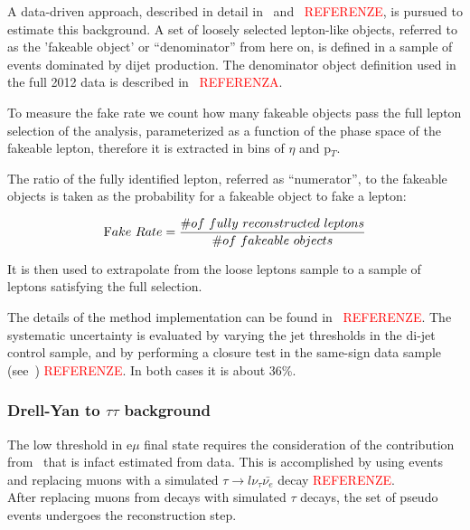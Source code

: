 A data-driven approach, described in detail in~\cite{AN-2010-261} and~\cite{AN-2010-397} \textcolor{red}{REFERENZE}, is pursued 
to estimate this background. A set of loosely selected lepton-like objects, referred to as the 
'fakeable object' or ``denominator'' from here on, is defined in a sample of events 
dominated by dijet production. The denominator object definition used in the full 2012
data is described in~\cite{AN-2012-378} \textcolor{red}{REFERENZA}.

To measure the fake rate we count how many fakeable objects pass the full lepton selection 
of the analysis, parameterized as a function of the phase space of the fakeable lepton, therefore 
it is extracted in bins of $\eta$ and p$_T$.


The ratio of the fully identified lepton, referred as ``numerator'', to the 
fakeable objects is taken as the probability for a fakeable object to fake a lepton:

\begin{equation} 
{\mbox Fake\ Rate } = \frac{\# of \ fully \ reconstructed \ leptons}{\# of \ fakeable \ objects} 
\end{equation}

It is then used to extrapolate from the loose leptons sample to a sample of leptons satisfying the  
full selection. 

The details of the method implementation can be found in~\cite{AN-2013-022} \textcolor{red}{REFERENZE}.
The systematic uncertainty is evaluated by varying the jet thresholds in the di-jet control sample, and by
performing a closure test in the same-sign data sample (see~\cite{AN-2013-022}) \textcolor{red}{REFERENZE}. In both cases it is about 36\%.

	\subsubsection{Drell-Yan to \texorpdfstring{$\tau\tau$}{tau tau} background\label{sec:DYtautaubkg}}


The low \MET threshold in e$\mu$ final state
requires the consideration of the contribution from 
\dytt\, that is infact estimated from data.
This is accomplished by using 
\dymm events and replacing muons with a simulated
$\tau\to l\nu_\tau\bar{\nu_e}$ decay \cite{AN-2011-020} \textcolor{red}{REFERENZE}.\\
After replacing muons from \dymm decays with simulated $\tau$ decays,
the set of pseudo \dytt events undergoes the reconstruction step.
 
